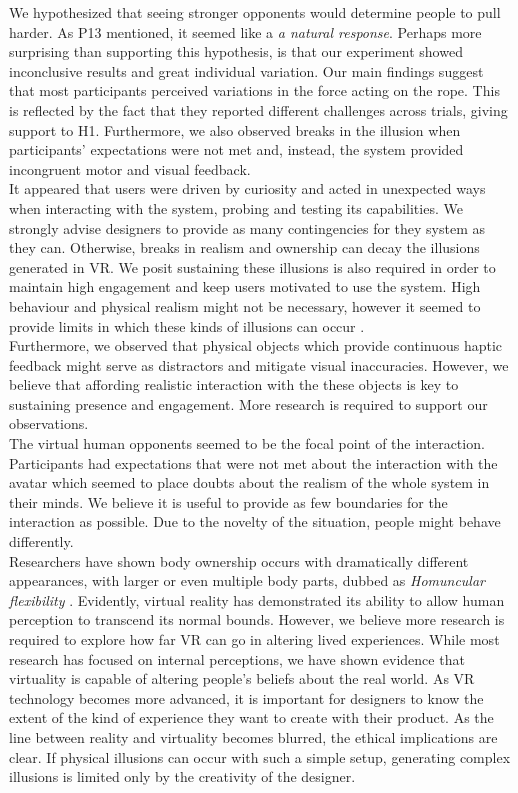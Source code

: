 We hypothesized that seeing stronger opponents would determine people to pull harder. As P13 mentioned, it seemed like a \textit{a natural response}. Perhaps more surprising than supporting this hypothesis, is that our experiment showed inconclusive results and great individual variation. Our main findings suggest that most participants perceived variations in the force acting on the rope. This is reflected by the fact that they reported different challenges across trials, giving support to H1. Furthermore, we also observed breaks in the illusion when participants' expectations were not met and, instead, the system provided incongruent motor and visual feedback.
\\
It appeared that users were driven by curiosity and acted in unexpected ways when interacting with the system, probing and testing its capabilities. We strongly advise designers to provide as many contingencies for they system as they can. Otherwise, breaks in realism and ownership can decay the illusions generated in VR. We posit sustaining these illusions is also required in order to maintain high engagement and keep users motivated to use the system. High behaviour and physical realism might not be necessary, however it seemed to provide limits in which these kinds of illusions can occur \cite{slater2009place}. \\
Furthermore, we observed that physical objects which provide continuous haptic feedback might serve as distractors and mitigate visual inaccuracies. However, we believe that affording realistic interaction with the these objects is key to sustaining presence and engagement. More research is required to support our observations.
\\
The virtual human opponents seemed to be the focal point of the interaction. Participants had expectations that were not met about the interaction with the avatar which seemed to place doubts about the realism of the whole system in their minds. We believe it is useful to provide as few boundaries for the interaction as possible. Due to the novelty of the situation, people might behave differently. \\
Researchers have shown body ownership occurs with dramatically different appearances, with larger or even multiple body parts, dubbed as \textit{Homuncular flexibility} \cite{normand2011multisensory, won2015homuncular}. Evidently, virtual reality has demonstrated its ability to allow human perception to transcend its normal bounds. However, we believe more research is required to explore how far VR can go in altering lived experiences. While most research has focused on internal perceptions, we have shown evidence that virtuality is capable of altering people's beliefs about the real world. As VR technology becomes more advanced, it is important for designers to know the extent of the kind of experience they want to create with their product. As the line between reality and virtuality becomes blurred, the ethical implications are clear. If physical illusions can occur with such a simple setup, generating complex illusions is limited only by the creativity of the designer.
 
 